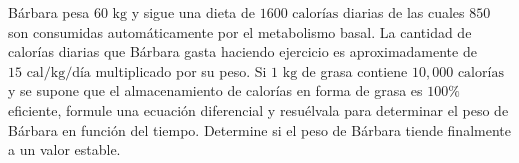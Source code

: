 \item Bárbara pesa $60 \text{ kg}$ y sigue una dieta de $1600 \text{ calorías}$ diarias de las cuales $850$ son consumidas automáticamente por el metabolismo basal. La cantidad de calorías diarias que Bárbara gasta haciendo ejercicio es aproximadamente de $15 \text{ cal/kg/día}$ multiplicado por su peso. Si $1 \text{ kg}$ de grasa contiene $10,000 \text{ calorías}$ y se supone que el almacenamiento de calorías en forma de grasa es $100\%$ eficiente, formule una ecuación diferencial y resuélvala para determinar el peso de Bárbara en función del tiempo. Determine si el peso de Bárbara tiende finalmente a un valor estable.
